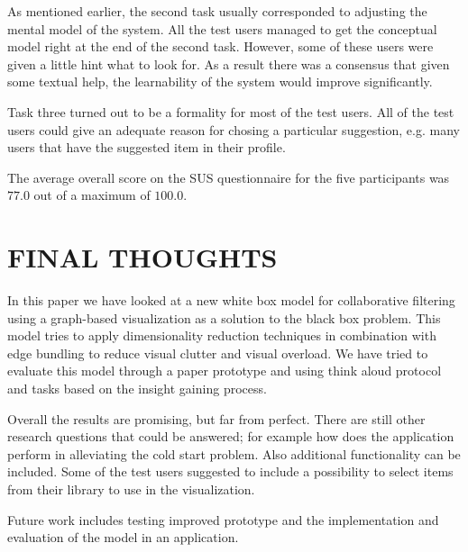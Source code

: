 \documentclass[a4paper,10pt,twocolumn]{article}
\begin{document}
As mentioned earlier, the second task usually corresponded to adjusting the mental model of the system. All the test users managed to get the conceptual model right at the end of the second task. However, some of these users were given a little hint what to look for. As a result there was a consensus that given some textual help, the learnability of the system would improve significantly.

Task three turned out to be a formality for most of the test users. All of the test users could give an adequate reason for chosing a particular suggestion, e.g. many users that have the suggested item in their profile.

The average overall score on the SUS questionnaire for the five participants was $77.0$ out of a maximum of $100.0$.


\section*{FINAL THOUGHTS}

In this paper we have looked at a new white box model for collaborative filtering using a graph-based visualization as a solution to the black box problem. This model tries to apply dimensionality reduction techniques in combination with edge bundling to reduce visual clutter and visual overload. We have tried to evaluate this model through a paper prototype and using think aloud protocol and tasks based on the insight gaining process.

Overall the results are promising, but far from perfect. There are still other research questions that could be answered; for example how does the application perform in alleviating the cold start problem. Also additional functionality can be included. Some of the test users suggested to include a possibility to select items from their library to use in the visualization.

Future work includes testing improved prototype and the implementation and evaluation of the model in an application.


%

\end{document}
